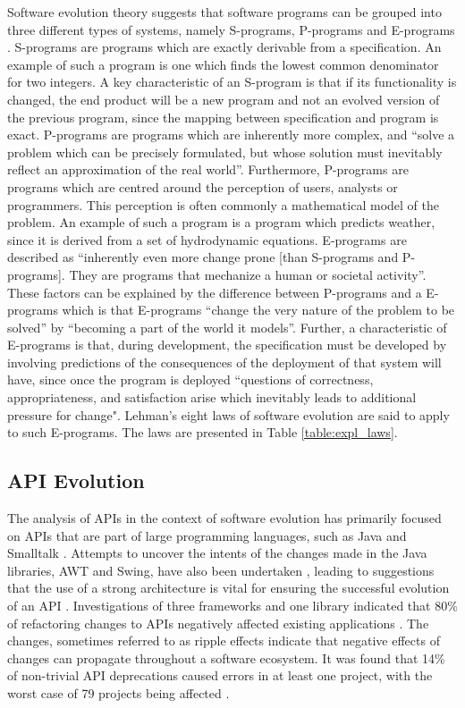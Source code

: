 \documentclass{sig-alternate}
\begin{document}
\newpage

Software evolution theory suggests that software programs can be grouped into three different types of systems, namely S-programs, P-programs and E-programs \cite{lehman1980programs}. S-programs are programs which are exactly derivable from a specification. An example of such a program is one which finds the lowest common denominator for two integers. A key characteristic of an S-program is that if its functionality is changed, the end product will be a new program and not an evolved version of the previous program, since the mapping between specification and program is exact. P-programs are programs which are inherently more complex, and ``solve a problem which can be precisely formulated, but whose solution must inevitably reflect an approximation of the real world''. Furthermore, P-programs are programs which are centred around the perception of users, analysts or programmers. This perception is often commonly a mathematical model of the problem. An example of such a program is a program which predicts weather, since it is derived from a set of hydrodynamic equations. E-programs are described as ``inherently even more change prone [than S-programs and P-programs]. They are programs that mechanize a human or societal activity''. These factors can be explained by the difference between P-programs and a E-programs which is that E-programs ``change the very nature of the problem to be solved'' by ``becoming a part of the world it models''. Further, a characteristic of E-programs is that, during development, the specification must be developed by involving predictions of the consequences of the deployment of that system will have, since once the program is deployed ``questions of correctness, appropriateness, and satisfaction arise which inevitably leads to additional pressure for change". Lehman's eight laws of software evolution are said to apply to such E-programs. The laws are presented in Table \ref{table:expl_laws}. 




\subsection{API Evolution} \label{related_work}
The analysis of APIs in the context of software evolution has primarily focused on APIs that are part of large programming languages, such as Java \cite{hou2011exploring, shi2011empirical} and Smalltalk \cite{robbes2012developers}. Attempts to uncover the intents of the changes made in the Java libraries, AWT and Swing, have also been undertaken \cite{hou2011exploring}, leading to suggestions that the use of a strong architecture is vital for ensuring the successful evolution of an API \cite{hou2011exploring}. Investigations of three frameworks and one library indicated that 80\% of refactoring changes to APIs negatively affected existing applications \cite{dig2005role}. The changes, sometimes referred to as ripple effects \cite{robbes2012developers} indicate that negative effects of changes can propagate throughout a software ecosystem. It was found that 14\% of non-trivial API deprecations caused errors in at least one project, with the worst case of 79 projects being affected \cite{robbes2012developers}.
\end{document}
